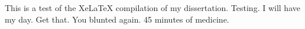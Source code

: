 \documentclass{memoir}
\begin{document}
This is a test of the XeLaTeX compilation of my
dissertation. Testing. I will have my day. Get that. You blunted again. 45
minutes of medicine.
\end{document}
